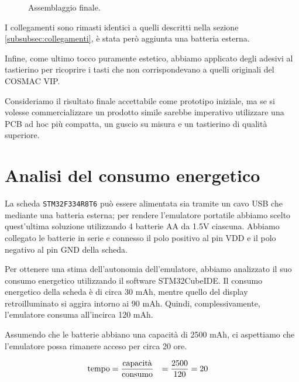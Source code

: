 \documentclass[a4paper]{article}
\begin{document}
\begin{figure}[h!t]
\begin{center}
    \end{center}
    \caption{Assemblaggio finale.}
    \label{fig:assemblaggio}
\end{figure}

I collegamenti sono rimasti identici a quelli descritti nella sezione
\ref{subsubsec:collegamenti}, è stata però aggiunta una batteria esterna.

Infine, come ultimo tocco puramente estetico, abbiamo applicato degli adesivi al tastierino
per ricoprire i tasti che non corrispondevano a quelli originali del COSMAC VIP.

Consideriamo il risultato finale accettabile come prototipo iniziale, ma se si volesse
commercializzare un prodotto simile sarebbe imperativo utilizzare una PCB ad hoc più compatta,
un guscio su misura e un tastierino di qualità superiore.

\section{Analisi del consumo energetico} %

La scheda \texttt{STM32F334R8T6} può essere alimentata sia tramite un cavo USB che mediante
una batteria esterna; per rendere l'emulatore portatile abbiamo scelto quest'ultima
soluzione utilizzando 4 batterie AA da 1.5V ciascuna. Abbiamo collegato le batterie in
serie e connesso il polo positivo al pin VDD e il polo negativo al pin GND della scheda.

%

Per ottenere una stima dell'autonomia dell'emulatore, abbiamo analizzato il suo consumo
energetico utilizzando il software STM32CubeIDE. Il consumo energetico della scheda è di
circa 30 mAh, mentre quello del display retroilluminato si aggira intorno ai 90 mAh.
Quindi, complessivamente, l'emulatore consuma all'incirca 120 mAh.

Assumendo che le batterie abbiano una capacità di 2500 mAh, ci aspettiamo che
l'emulatore possa rimanere acceso per circa 20 ore.

\begin{equation*}
    \begin{aligned}
        \textmd{tempo} & = \frac{\textmd{capacità}}{\textmd{consumo}} & = \frac{2500}{120} & = 20
    \end{aligned}
\end{equation*}
\end{document}
